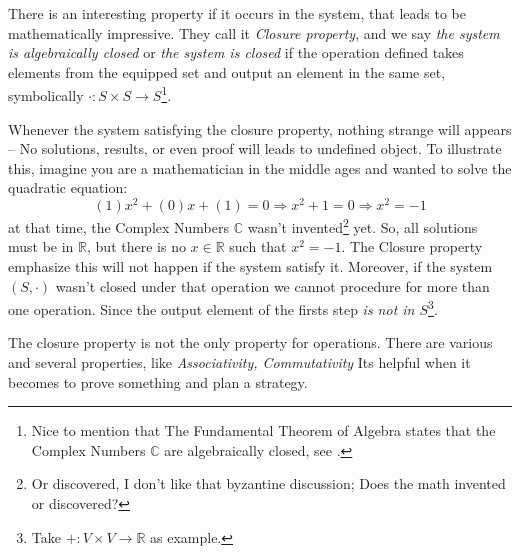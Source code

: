 There is an interesting property if it occurs in the system, that leads to be mathematically impressive. They call it {\it Closure property}, and we say {\it the system is algebraically closed} or {\it the system is closed} if the operation defined takes elements from the equipped set and output an element in the same set, symbolically $\cdot: S\times S\longrightarrow S$\footnote{Nice to mention that The Fundamental Theorem of Algebra states that the Complex Numbers $\mathbb{C}$ are algebraically closed, see \cite{enwiki:1023272575}.}.

Whenever the system satisfying the closure property, nothing strange will appears -- No solutions, results, or even proof will leads to undefined object. To illustrate this, imagine you are a mathematician in the middle ages and wanted to solve the quadratic equation: $$(1)x^2+(0)x+(1)=0 \Longrightarrow x^{2}+1=0 \Longrightarrow x^{2}=-1$$ 
at that time, the Complex Numbers $\mathbb{C}$ wasn't invented\footnote{Or discovered, I don't like that byzantine discussion; Does the math invented or discovered?} yet. So, all solutions must be in $\mathbb{R}$, but there is no $x \in \mathbb{R}$ such that $x^{2}=-1$. The Closure property emphasize this will not happen if the system satisfy it.
Moreover, if the system $(S,\cdot)$ wasn't closed under that operation we cannot procedure for more than one operation. Since the output element of the firsts step  {\it is not in $S$}\footnote{Take $+:V\times V\longrightarrow \mathbb{R}$ as example.}. 

The closure property is not the only property for operations. There are various and several properties, like {\it Associativity, Commutativity } Its helpful when it becomes to prove something and plan a strategy.